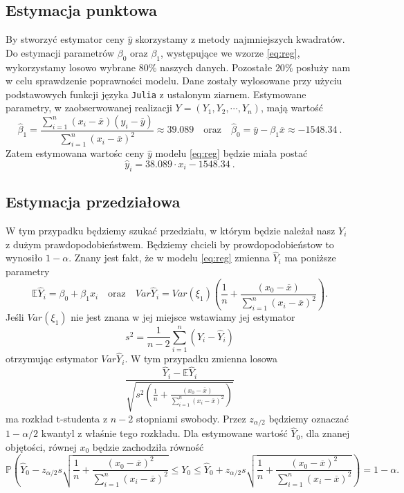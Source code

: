 \documentclass[12pt]{article}
\theoremstyle{exer}
\begin{document}
	\subsection{Estymacja punktowa}
	By stworzyć estymator ceny $\hat y$ skorzystamy z metody najmniejszych kwadratów. Do estymacji parametrów $\beta_0$ oraz $\beta_1$, występujące we wzorze \eqref{eq:reg}, wykorzystamy losowo wybrane $80\%$ naszych danych. Pozostałe $20\%$ posłuży nam w celu sprawdzenie poprawności modelu. Dane zostały wylosowane przy użyciu podstawowych funkcji języka \verb|Julia| z ustalonym ziarnem. Estymowane parametry, w zaobserwowanej realizacji $Y=(Y_1, Y_2,\cdots,Y_n)$, mają wartość
	\begin{equation}
		\hat\beta_1=\frac{\sum_{i=1}^n\left(x_i-\overline{x}\right)\left(y_i-\overline{y}\right)}
		{\sum_{i=1}^n\left(x_i-\overline{x}\right)^2}\approx39.089 \quad \text{oraz} \quad
		\hat\beta_0=\overline{y}-\beta_1\overline{x}\approx-1548.34\ .
	\end{equation}
	Zatem estymowana wartośc ceny $\hat y$ modelu \eqref{eq:reg} będzie miała postać
	\begin{equation}\label{eq:model}
		\hat y_i = 38.089\cdot x_i -1548.34\ .
	\end{equation}
	\subsection{Estymacja przedziałowa}
	W tym przypadku będziemy szukać przedziału, w którym będzie należał nasz $Y_i$ z dużym prawdopodobieństwem. Będziemy chcieli by prowdopodobieństow to wynosiło $1-\alpha$. Znany jest fakt, że w modelu \eqref{eq:reg} zmienna $\hat{Y}_i$ ma poniższe parametry
	\begin{equation}
		\mathbb{E}\hat Y_i = \beta_0+\beta_1x_i \quad\text{oraz}\quad Var \hat Y_i=Var\left(\xi_1\right)\left(\frac{1}{n}+\frac{(x_0-\overline{x})}{\sum_{i=1}^{n}\left(x_i-\overline{x}\right)^2}\right).
	\end{equation} 
	Jeśli $Var\left(\xi_1\right)$ nie jest znana w jej miejsce wstawiamy jej estymator
	\begin{equation}
		s^2=\frac{1}{n-2}\sum_{i=1}^{n}\left(Y_i-\hat Y_i\right)
	\end{equation}
	otrzymując estymator $Var \hat Y_i$. W tym przypadku zmienna losowa
	\begin{equation}
		\frac{\hat Y_i-\mathbb{E}\hat Y_i}{\sqrt{s^2\left(\frac{1}{n}+\frac{(x_0-\overline{x})}{\sum_{i=1}^{n}\left(x_i-\overline{x}\right)^2}\right)}}
	\end{equation}
	ma rozkład t-studenta z $n-2$ stopniami swobody. Przez $z_{\alpha/2}$ będziemy oznaczać $1-\alpha/2$ kwantyl z właśnie tego rozkładu. Dla estymowane wartość $\hat Y_0$, dla znanej objętości, równej $x_0$ będzie zachodziła równość
	\begin{equation}
		\mathbb{P}\left(\hat Y_0 - z_{\alpha/2}s\sqrt{\frac{1}{n}+\frac{\left(x_0-\overline{x}\right)^2}{\sum_{i=1}^n\left(x_i-\overline{x}\right)^2}}\leq Y_0\leq\hat Y_0 + z_{\alpha/2}s\sqrt{\frac{1}{n}+\frac{\left(x_0-\overline{x}\right)^2}{\sum_{i=1}^n\left(x_i-\overline{x}\right)^2}}\right)=1-\alpha.
	\end{equation}
\end{document}

